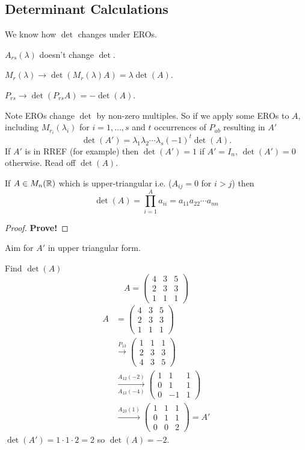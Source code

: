 \documentclass[10pt, a4paper]{article}
\begin{document}
\subsection{Determinant Calculations}
We know how $\det$ changes under EROs.

$A_{rs}(\lambda)$ doesn't change $\det$.

$M_r(\lambda) \rightarrow \det(M_r(\lambda)A) = \lambda\det(A)$.

$P_{rs} \rightarrow \det(P_{rs}A) = -\det(A)$.

Note EROs change $\det$ by non-zero multiples.
So if we apply some EROs to $A$,
including $M_{r_i}(\lambda_i)$ for $i = 1, \dotsc, s$ and $t$ occurrences of $P_{ab}$ resulting in $A'$
\[
\det(A') = \lambda_1\lambda_2\dotsi\lambda_s(-1) ^ t\det(A).
\]
If $A'$ is in RREF (for example) then $\det(A') = 1$ if $A' = I_n$,
$\det(A') = 0$ otherwise.
Read off $\det(A)$.

\begin{proposition}
    If $A \in M_n(\mathbb{R})$ which is upper-triangular i.e. ($A_{ij} = 0$ for $i > j$)
    then
    \[
    \det(A) = \prod_{i = 1}^{A}a_{ii} = a_{11}a_{22}\dotsi a_{nn}
    \]
    \begin{proof}
        \large\textbf{Prove!}
    \end{proof}
\end{proposition}

Aim for $A'$ in upper triangular form.
\begin{example}
    Find $\det(A)$
    \[
    A = \begin{pmatrix} 4 & 3 & 5 \\ 2 & 3 & 3 \\ 1 & 1 & 1 \end{pmatrix}
    \]
    \begin{align*}
        A &= \begin{pmatrix} 4 & 3 & 5 \\ 2 & 3 & 3 \\ 1 & 1 & 1 \end{pmatrix} \\
        &\xrightarrow{P_{13}} \begin{pmatrix} 1 & 1 & 1 \\ 2 & 3 & 3 \\ 4 & 3 & 5 \end{pmatrix} \\
        &\xrightarrow[A_{13}(-4)]{A_{12}(-2)} \begin{pmatrix} 1 & 1 & 1 \\ 0 & 1 & 1 \\ 0 & -1 & 1 \end{pmatrix} \\
        &\xrightarrow{A_{23}(1)}
        \begin{pmatrix} 1 & 1 & 1 \\ 0 & 1 & 1 \\ 0 & 0 & 2 \end{pmatrix} = A'
    \end{align*}
    $\det(A') = 1 \cdot 1 \cdot 2 = 2$ so $\det(A) = -2$.
\end{example}
\end{document}
